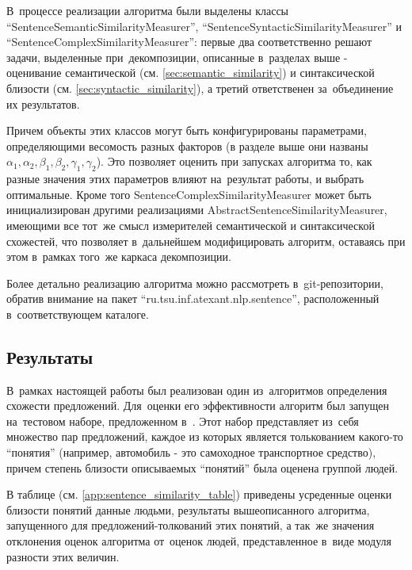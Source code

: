 В~процессе реализации алгоритма были выделены классы ``SentenceSemanticSimilarityMeasurer'',
``SentenceSyntacticSimilarityMeasurer'' и ``SentenceComplexSimilarityMeasurer'':
первые два соответственно решают задачи, выделенные при~декомпозиции, описанные
в~разделах выше - оценивание семантической (см. \ref{sec:semantic_similarity}) 
и синтаксической близости (см. \ref{sec:syntactic_similarity}),
а третий ответственен за~объединение их результатов. 

Причем объекты этих классов
могут быть конфигурированы параметрами, определяющими весомость разных факторов
(в разделе выше они названы $\alpha_1,\alpha_2,\beta_1, \beta_2, \gamma_1, \gamma_2$).
Это позволяет оценить при запусках алгоритма то, как разные значения этих параметров влияют на~результат работы,
и выбрать оптимальные. Кроме того SentenceComplexSimilarityMeasurer может быть инициализирован 
другими реализациями AbstractSentenceSimilarityMeasurer, имеющими все тот~же смысл
измерителей семантической и синтаксической схожестей, что позволяет в~дальнейшем модифицировать алгоритм,
оставаясь при этом в~рамках того~же каркаса декомпозиции. 

Более детально реализацию алгоритма можно рассмотреть в~git-репозитории\cite{github},
обратив внимание на пакет ``ru.tsu.inf.atexant.nlp.sentence'',
расположенный в~соответствующем каталоге.

\subsection{Результаты}
В~рамках настоящей работы был реализован один из~алгоритмов определения схожести предложений.
Для~оценки его эффективности алгоритм был запущен на~тестовом наборе,
предложенном в~\cite{complexSim}. Этот набор представляет из~себя множество пар предложений,
каждое из которых является толькованием какого-то ``понятия'' (например, автомобиль - это самоходное транспортное средство),
причем степень близости описываемых ``понятий'' была оценена группой людей.

В таблице (см. \ref{app:sentence_similarity_table}) приведены усреденные оценки близости понятий данные людьми,
результаты вышеописанного алгоритма, запущенного для предложений-толкований этих понятий, 
а так~же значения отклонения оценок алгоритма от~оценок людей, 
представленное в~виде модуля разности этих величин.

